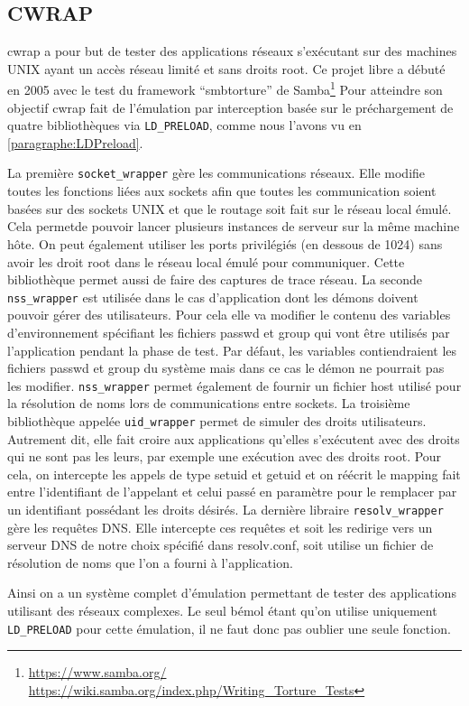 \subsection{CWRAP}

cwrap\citep{cwrap, cwrap_bis} a pour but de tester des applications réseaux s'exécutant sur des machines UNIX ayant un accès réseau limité et sans droits root. Ce projet libre a débuté en 2005 avec le test du framework ``smbtorture'' de Samba\footnote{\url{https://www.samba.org/} \\ \url{https://wiki.samba.org/index.php/Writing\_Torture\_Tests}} Pour atteindre son objectif cwrap fait de l'émulation par interception basée sur le préchargement de quatre bibliothèques via \texttt{LD\_PRELOAD}, comme nous l'avons vu en \ref{paragraphe:LDPreload}.

La première \texttt{socket\_wrapper} gère les communications réseaux. Elle modifie toutes les fonctions liées aux sockets afin que toutes les communication soient basées sur des sockets UNIX et que le routage soit fait sur le réseau local émulé. Cela permetde pouvoir lancer plusieurs instances de serveur sur la même machine hôte. On peut également utiliser les ports privilégiés (en dessous de 1024) sans avoir les droit root dans le réseau local émulé pour communiquer. Cette bibliothèque permet aussi de faire des captures de trace réseau. La seconde \texttt{nss\_wrapper} est utilisée dans le cas d'application dont les démons doivent pouvoir gérer des utilisateurs. Pour cela elle va modifier le contenu des variables d'environnement spécifiant les fichiers passwd et group qui vont être utilisés par l'application pendant la phase de test. Par défaut, les variables contiendraient les fichiers passwd et group du système mais dans ce cas le démon ne pourrait pas les modifier. \texttt{nss\_wrapper} permet également de fournir un fichier host utilisé pour la résolution de noms lors de communications entre sockets. La troisième bibliothèque appelée \texttt{uid\_wrapper} permet de simuler des droits utilisateurs. Autrement dit, elle fait croire aux applications qu'elles s'exécutent avec des droits qui ne sont pas les leurs, par exemple une exécution avec des droits root. Pour cela, on intercepte les appels de type setuid et getuid et on réécrit le mapping fait entre l'identifiant de l'appelant et celui passé en paramètre pour le remplacer par un identifiant possédant les droits désirés. La dernière libraire \texttt{resolv\_wrapper} gère les requêtes DNS. Elle intercepte ces requêtes et soit les redirige vers un serveur DNS de notre choix spécifié dans resolv.conf, soit utilise un fichier de résolution de noms que l'on a fourni à l'application.

Ainsi on a un système complet d'émulation permettant de tester des applications utilisant des réseaux complexes. Le seul bémol étant qu'on utilise uniquement \texttt{LD\_PRELOAD} pour cette émulation, il ne faut donc pas oublier une seule fonction.




